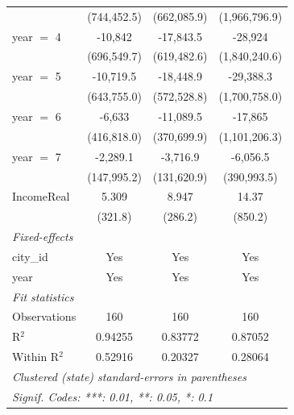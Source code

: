 \begin{tabular}{lccc}
                        & (744,452.5)           & (662,085.9)            & (1,966,796.9)\\   
   year $=$ 4           & -10,842               & -17,843.5              & -28,924\\   
                        & (696,549.7)           & (619,482.6)            & (1,840,240.6)\\   
   year $=$ 5           & -10,719.5             & -18,448.9              & -29,388.3\\   
                        & (643,755.0)           & (572,528.8)            & (1,700,758.0)\\   
   year $=$ 6           & -6,633                & -11,089.5              & -17,865\\   
                        & (416,818.0)           & (370,699.9)            & (1,101,206.3)\\   
   year $=$ 7           & -2,289.1              & -3,716.9               & -6,056.5\\   
                        & (147,995.2)           & (131,620.9)            & (390,993.5)\\   
   IncomeReal           & 5.309                 & 8.947                  & 14.37\\   
                        & (321.8)               & (286.2)                & (850.2)\\   
   \midrule
   \emph{Fixed-effects}\\
   city\_id             & Yes                   & Yes                    & Yes\\  
   year                 & Yes                   & Yes                    & Yes\\  
   \midrule
   \emph{Fit statistics}\\
   Observations         & 160                   & 160                    & 160\\  
   R$^2$                & 0.94255               & 0.83772                & 0.87052\\  
   Within R$^2$         & 0.52916               & 0.20327                & 0.28064\\  
   \midrule \midrule
   \multicolumn{4}{l}{\emph{Clustered (state) standard-errors in parentheses}}\\
   \multicolumn{4}{l}{\emph{Signif. Codes: ***: 0.01, **: 0.05, *: 0.1}}\\
\end{tabular}
\par\endgroup


